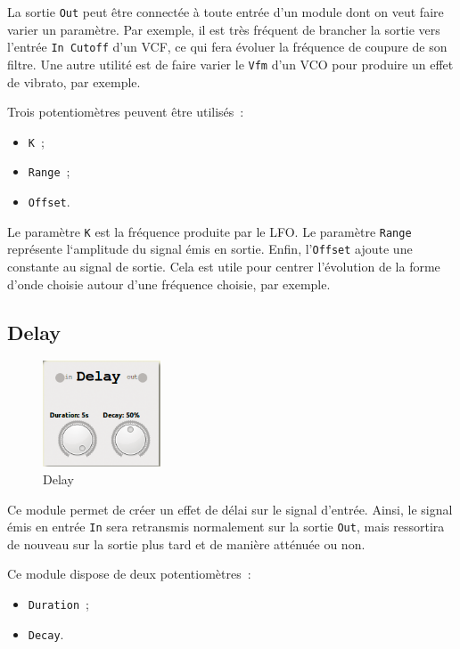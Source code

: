 \documentclass[a4paper,oneside,frenchb,10pt]{article}
\begin{document}
La sortie \verb!Out! peut être connectée à toute entrée d'un module dont
on veut faire varier un paramètre. Par exemple, il est très fréquent de
brancher la sortie vers l'entrée \verb!In Cutoff! d'un VCF, ce qui fera
évoluer la fréquence de coupure de son filtre. Une autre utilité est de
faire varier le \verb!Vfm! d'un VCO pour produire un effet de vibrato,
par exemple.

Trois potentiomètres peuvent être utilisés~:

\begin{itemize}
\item
  \verb!K!~;
\item
  \verb!Range!~;
\item
  \verb!Offset!.
\end{itemize}
Le paramètre \verb!K! est la fréquence produite par le LFO. Le paramètre
\verb!Range! représente l`amplitude du signal émis en sortie. Enfin,
l'\verb!Offset! ajoute une constante au signal de sortie. Cela est utile
pour centrer l'évolution de la forme d'onde choisie autour d'une
fréquence choisie, par exemple.

\newpage

\subsection{Delay}

\begin{multicols}{2}

\begin{figure}[H]
\centering
\includegraphics[width=3.5cm]{../img/png/delay.png}
\caption{Delay}
\end{figure}

Ce module permet de créer un effet de délai sur le signal d'entrée.
Ainsi, le signal émis en entrée \verb!In! sera retransmis normalement
sur la sortie \verb!Out!, mais ressortira de nouveau sur la sortie plus
tard et de manière atténuée ou non.

Ce module dispose de deux potentiomètres~:

\begin{itemize}
\item
  \verb!Duration!~;
\item
  \verb!Decay!.
\end{itemize}
\end{multicols}
\end{document}
